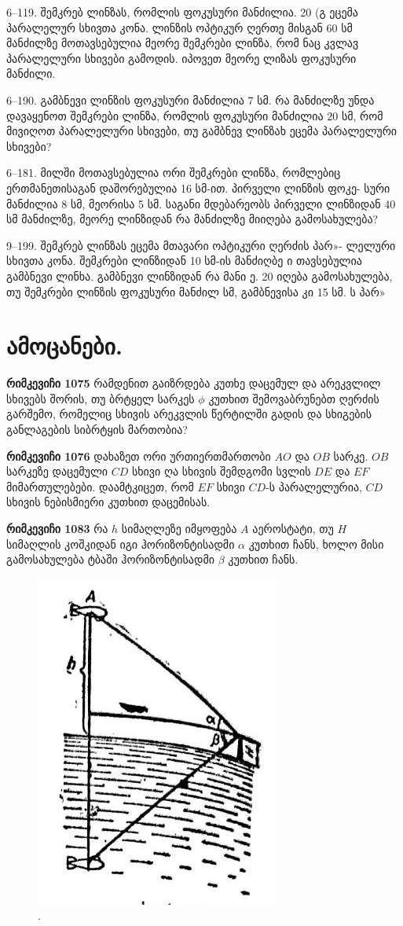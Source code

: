 \documentclass{book}
\begin{document}
6--119. შემკრებ ლინზას, რომლის ფოკუსური მანძილია. 20 (გ
ეცემა პარალელურ სხივთა კონა. ლინზის ოპტიკურ ღერთე მისგან
60 სმ მანძილზე მოთავსებულია მეორე შემკრები ლინზა, რომ
ნაც კვლავ პარალელური სხივები გამოდის. იპოვეთ მეორე ლიზას
ფოკუსური მანძილი.

6--190. გამბნევი ლინზის ფოკუსური მანძილია 7 სმ. რა მანძილზე
უნდა დავაყენოთ შემკრები ლინზა, რომლის ფოკუსური მანძილია 20
სმ, რომ მივიღოთ პარალელური სხივები, თუ გამბნევ ლინზახ ეცემა
პარალელური სხივები?

6--181. მილში მოთავსებულია ორი შემკრები ლინზა, რომლებიც
ერთმანეთისაგან დაშორებულია 16 სმ-ით. პირველი ლინზის ფოკე-
სური მანძილია 8 სმ, მეორისა 5 სმ. საგანი მდებარეობს პირველი
ლინზიდან 40 სმ მანძილზე, მეორე ლინზიდან რა მანძილზე მიიღება
გამოსახულება?

9--199. შემკრებ ლინზას ეცემა მთავარი ოპტიკური ღერძის პარ»-
ლელური სხივთა კონა. შემკრები ლინზიდან 10 სმ-ის მანძიღბე ი
თავსებულია გამბნევი ლინხა. გამბნევი ლინზიდან რა მანი ე. 20
იღება გამოსახულება, თუ შემკრები ლინზის ფოკუსური მანძილ
სმ, გამბნევისა კი 15 სმ. ს პარ»

\section{ამოცანები.}

\textbf{რიმკევიჩი 1075} რამდენით გაიზრდება კუთხე დაცემულ და არეკვლილ სხივებს შორის, თუ ბრტყელ სარკეს $\phi$ კუთხით შემოვაბრუნებთ ღერძის გარშემო, რომელიც სხივის არეკვლის წერტილში გადის და სხიგების განლაგების სიბრტყის მართობია?

\textbf{რიმკევიჩი 1076} დახაზეთ ორი ურთიერთმართობი $AO$ და $OB$ სარკე. $OB$ სარკეზე დაცემული $CD$ სხივი ღა სხივის შემდგომი სვლის $DE$ და $EF$ მიმართულებები. დაამტკიცეთ, რომ $EF$ სხივი $CD$-ს პარალელურია, $CD$ სხივის ნებისმიერი კუთხით დაცემისას.

\textbf{რიმკევიჩი 1083} რა $h$ სიმაღლეზე იმყოფება $A$ აეროსტატი, თუ $H$ სიმაღლის კოშკიდან იგი ჰორიზონტისადმი $\alpha$ კუთხით ჩანს, ხოლო მისი გამოსახულება ტბაში ჰორიზონტისადმი $\beta$ კუთხით ჩანს.
		\begin{figure}[h]
		   \centering
           \includegraphics[width=0.5\columnwidth]{figures/1083}
           \caption{.}
           \label{fig:1083}
        \end{figure}
\end{document}
